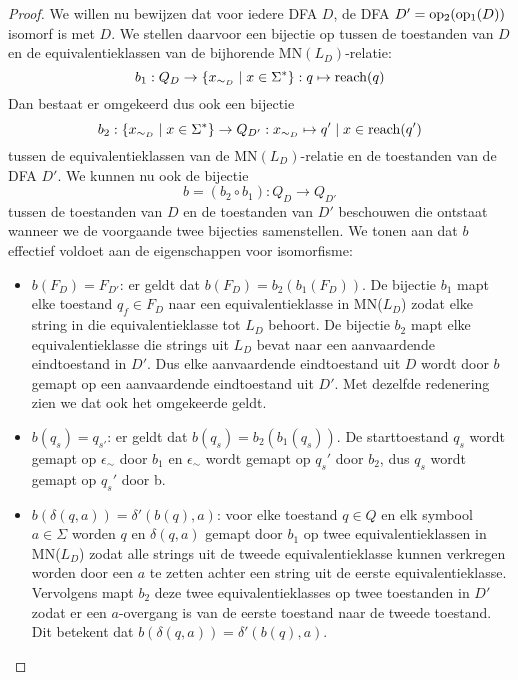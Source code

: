 \documentclass[../aanvullingen_cursus.tex]{subfiles}
\begin{document}
\begin{proof}
	\newpage
	We willen nu bewijzen dat voor iedere DFA \(D\), de DFA \(D'=\operatorname{op_2}(\operatorname{op_1}(D))\) isomorf is met \(D\). We stellen daarvoor een bijectie op tussen de toestanden van \(D\) en de equivalentieklassen van de bijhorende MN\((L_D)\)-relatie: \[b_1:Q_D\to \{x_{\sim_D} \mid x\in \Sigma^*\}: q \mapsto \operatorname{reach}(q)\] Dan bestaat er omgekeerd dus ook een bijectie \[b_2:\{x_{\sim_D} \mid x\in \Sigma^*\} \to Q_{D'}: x_{\sim_D} \mapsto q' \mid x\in\operatorname{reach}(q')\] tussen de equivalentieklassen van de MN\((L_D)\)-relatie en de toestanden van de DFA \(D'\). We kunnen nu ook de bijectie \[b=(b_2 \circ b_1):Q_D\to Q_{D'}\] tussen de toestanden van \(D\) en de toestanden van \(D'\) beschouwen die ontstaat wanneer we de voorgaande twee bijecties samenstellen. We tonen aan dat \(b\) effectief voldoet aan de eigenschappen voor isomorfisme:
	\begin{itemize}
		\item \underline{\(b(F_D)=F_{D'}\)}: er geldt dat \(b(F_D)=b_2(b_1(F_D))\). De bijectie \(b_1\) mapt elke toestand \(q_f \in F_D\) naar een equivalentieklasse in MN(\(L_D\)) zodat elke string in die equivalentieklasse tot \(L_D\) behoort. De bijectie \(b_2\) mapt elke equivalentieklasse die strings uit \(L_D\) bevat naar een aanvaardende eindtoestand in \(D'\). Dus elke aanvaardende eindtoestand uit \(D\) wordt door \(b\) gemapt op een aanvaardende eindtoestand uit \(D'\). Met dezelfde redenering zien we dat ook het omgekeerde geldt.
		\item \underline{\(b(q_{s})=q_{s'}\)}: er geldt dat \(b(q_s)=b_2(b_1(q_s))\). De starttoestand \(q_s\) wordt gemapt op \(\epsilon_{\sim}\) door \(b_1\) en \(\epsilon_{\sim}\) wordt gemapt op \(q_s'\) door \(b_2\), dus \(q_s\) wordt gemapt op \(q_s'\) door b.
		\item \underline{\(b(\delta(q,a))=\delta'(b(q),a)\)}: voor elke toestand \(q \in Q\) en elk symbool \(a \in \Sigma\) worden \(q\) en \(\delta(q,a)\) gemapt door \(b_1\) op twee equivalentieklassen in MN(\(L_D\)) zodat alle strings uit de tweede equivalentieklasse kunnen verkregen worden door een \(a\) te zetten achter een string uit de eerste equivalentieklasse. Vervolgens mapt \(b_2\) deze twee equivalentieklasses op twee toestanden in \(D'\) zodat er een \(a\)-overgang is van de eerste toestand naar de tweede toestand. Dit betekent dat \(b(\delta(q,a))=\delta'(b(q),a)\).
	\end{itemize}

\end{proof}
\end{document}
